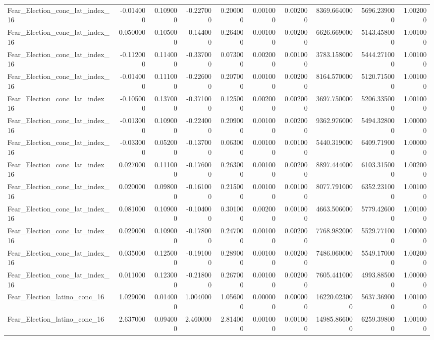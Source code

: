 \begin{table}
\begin{tabular}{lrrrrrrrrr}
Fear_Election_conc_lat_index_16 & -0.014000 & 0.109000 & -0.227000 & 0.200000 & 0.001000 & 0.002000 & 8369.664000 & 5696.239000 & 1.002000 \\
Fear_Election_conc_lat_index_16 & 0.050000 & 0.105000 & -0.144000 & 0.264000 & 0.001000 & 0.002000 & 6626.669000 & 5143.458000 & 1.001000 \\
Fear_Election_conc_lat_index_16 & -0.112000 & 0.114000 & -0.337000 & 0.073000 & 0.002000 & 0.001000 & 3783.158000 & 5444.271000 & 1.001000 \\
Fear_Election_conc_lat_index_16 & -0.014000 & 0.111000 & -0.226000 & 0.207000 & 0.001000 & 0.002000 & 8164.570000 & 5120.715000 & 1.001000 \\
Fear_Election_conc_lat_index_16 & -0.105000 & 0.137000 & -0.371000 & 0.125000 & 0.002000 & 0.002000 & 3697.750000 & 5206.335000 & 1.001000 \\
Fear_Election_conc_lat_index_16 & -0.013000 & 0.109000 & -0.224000 & 0.209000 & 0.001000 & 0.002000 & 9362.976000 & 5494.328000 & 1.000000 \\
Fear_Election_conc_lat_index_16 & -0.033000 & 0.052000 & -0.137000 & 0.063000 & 0.001000 & 0.001000 & 5440.319000 & 6409.719000 & 1.000000 \\
Fear_Election_conc_lat_index_16 & 0.027000 & 0.111000 & -0.176000 & 0.263000 & 0.001000 & 0.002000 & 8897.444000 & 6103.315000 & 1.002000 \\
Fear_Election_conc_lat_index_16 & 0.020000 & 0.098000 & -0.161000 & 0.215000 & 0.001000 & 0.001000 & 8077.791000 & 6352.231000 & 1.001000 \\
Fear_Election_conc_lat_index_16 & 0.081000 & 0.109000 & -0.104000 & 0.301000 & 0.002000 & 0.001000 & 4663.506000 & 5779.426000 & 1.001000 \\
Fear_Election_conc_lat_index_16 & 0.029000 & 0.109000 & -0.178000 & 0.247000 & 0.001000 & 0.002000 & 7768.982000 & 5529.771000 & 1.000000 \\
Fear_Election_conc_lat_index_16 & 0.035000 & 0.125000 & -0.191000 & 0.289000 & 0.001000 & 0.002000 & 7486.060000 & 5549.170000 & 1.002000 \\
Fear_Election_conc_lat_index_16 & 0.011000 & 0.123000 & -0.218000 & 0.267000 & 0.001000 & 0.002000 & 7605.441000 & 4993.885000 & 1.000000 \\
Fear_Election_latino_conc_16 & 1.029000 & 0.014000 & 1.004000 & 1.056000 & 0.000000 & 0.000000 & 16220.023000 & 5637.369000 & 1.001000 \\
Fear_Election_latino_conc_16 & 2.637000 & 0.094000 & 2.460000 & 2.814000 & 0.001000 & 0.001000 & 14985.866000 & 6259.398000 & 1.001000 \\

\end{tabular}
\end{table}
